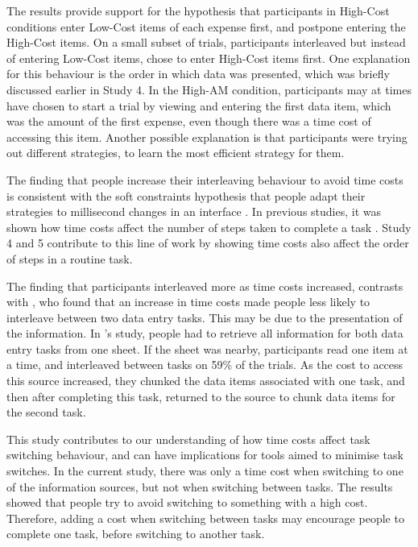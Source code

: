 The results provide support for the hypothesis that participants in High-Cost conditions enter Low-Cost items of each expense first, and postpone entering the High-Cost items. On a small subset of trials, participants interleaved but instead of entering Low-Cost items, chose to enter High-Cost items first. One explanation for this behaviour is the order in which data was presented, which was briefly discussed earlier in Study 4. In the High-AM condition, participants may at times have chosen to start a trial by viewing and entering the first data item, which was the amount of the first expense, even though there was a time cost of accessing this item. Another possible explanation is that participants were trying out different strategies, to learn the most efficient strategy for them. 


The finding that people increase their interleaving behaviour to avoid time costs is consistent with the soft constraints hypothesis that people adapt their strategies to millisecond changes in an interface \citep{Charman2003, Gray2004}. In previous studies, it was shown how time costs affect the number of steps taken to complete a task \citep{Gray2006}. Study 4 and 5 contribute to this line of work by showing time costs also affect the order of steps in a routine task.

The finding that participants interleaved more as time costs increased, contrasts with \citet{Back2012}, who found that an increase in time costs made people less likely to interleave between two data entry tasks. This may be due to the presentation of the information. In \citet{Back2012}'s study, people had to retrieve all information for both data entry tasks from one sheet. If the sheet was nearby, participants read one item at a time, and interleaved between tasks on 59\% of the trials.  As the cost to access this source increased, they chunked the data items associated with one task, and then after completing this task, returned to the source to chunk data items for the second task. 


This study contributes to our understanding of how time costs affect task switching behaviour, and can have implications for tools aimed to minimise task switches. In the current study, there was only a time cost when switching to one of the information sources, but not when switching between tasks. The results showed that people try to avoid switching to something with a high cost. Therefore, adding a cost when switching between tasks may encourage people to complete one task, before switching to another task.

